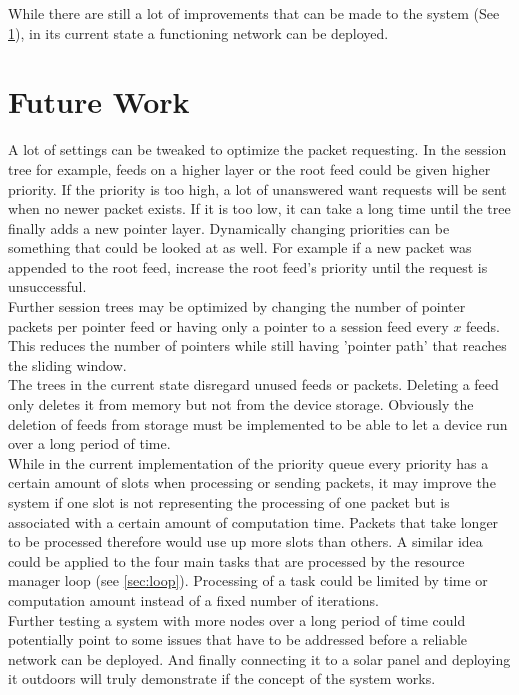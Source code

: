 While there are still a lot of improvements that can be made to the system (See \cref{sec:futurework}), in its current state a functioning network can be deployed.

\section{Future Work}
\label{sec:futurework}
A lot of settings can be tweaked to optimize the packet requesting. In the session tree for example, feeds on a higher layer or the root feed could be given higher priority. If the priority is too high, a lot of unanswered want requests will be sent when no newer packet exists. If it is too low, it can take a long time until the tree finally adds a new pointer layer. Dynamically changing priorities can be something that could be looked at as well. For example if a new packet was appended to the root feed, increase the root feed's priority until the request is unsuccessful. \\
Further session trees may be optimized by changing the number of pointer packets per pointer feed or having only a pointer to a session feed every $x$ feeds. This reduces the number of pointers while still having 'pointer path' that reaches the sliding window. \\
The trees in the current state disregard unused feeds or packets. Deleting a feed only deletes it from memory but not from the device storage. Obviously the deletion of feeds from storage must be implemented to be able to let a device run over a long period of time. \\
While in the current implementation of the priority queue every priority has a certain amount of slots when processing or sending packets, it may improve the system if one slot is not representing the processing of one packet but is associated with a certain amount of computation time. Packets that take longer to be processed therefore would use up more slots than others. A similar idea could be applied to the four main tasks that are processed by the resource manager loop (see \cref{sec:loop}). Processing of a task could be limited by time or computation amount instead of a fixed number of iterations. \\
Further testing a system with more nodes over a long period of time could potentially point to some issues that have to be addressed before a reliable network can be deployed. And finally connecting it to a solar panel and deploying it outdoors will truly demonstrate if the concept of the system works. \\